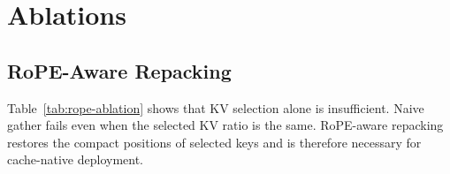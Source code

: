 \documentclass{article}
\begin{document}
\begin{table}[t]
\centering
\caption{Cache-native overhead decomposition. Times are per-run aggregate component differences from the full-cache baseline.}
\label{tab:overhead}
\end{table}

\section{Ablations}

\subsection{RoPE-Aware Repacking}

Table~\ref{tab:rope-ablation} shows that KV selection alone is insufficient.
Naive gather fails even when the selected KV ratio is the same.
RoPE-aware repacking restores the compact positions of selected keys and is therefore necessary for cache-native deployment.
\end{document}
